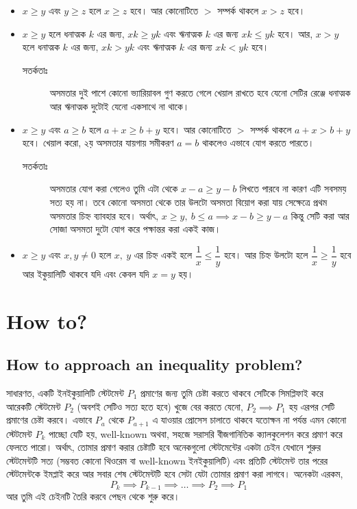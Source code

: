 \documentclass[12pt]{article}
\begin{document}
\begin{theom*} %
    \begin{itemize}
        \item $x \geq y$ এবং $y \geq z$ হলে $x \geq z$ হবে। আর কোনোটিতে $>$ সম্পর্ক থাকলে $x > z$ হবে।
        \item $x \geq y$ হলে ধনাত্মক $k$ এর জন্য, $xk \geq yk$ এবং ঋনাত্মক $k$ এর জন্য $xk \leq yk$ হবে। আর, 
            $x > y$ হলে ধনাত্মক $k$ এর জন্য, $xk > yk$ এবং ঋনাত্মক $k$ এর জন্য $xk < yk$ হবে।
            \begin{description}
                \item[সতর্কতাঃ] অসমতার দুই পাশে কোনো ভ্যারিয়াবল গুণ করতে গেলে খেয়াল রাখতে হবে যেনো 
                সেটির রেঞ্জে ধনাত্মক আর ঋনাত্মক দুটোই যেনো একসাথে না থাকে।
            \end{description}
        \item $x \geq y$ এবং $a \geq b$ হলে $a + x \geq b + y$ হবে। আর কোনোটিতে $>$ সম্পর্ক থাকলে 
            $a + x > b+y$ হবে। খেয়াল করো, ২য় অসমতার যায়গায় সমীকরণ $a = b$ থাকলেও এভাবে যোগ করতে পারতে।
            \begin{description}
                \item[সতর্কতাঃ] অসমতার যোগ করা গেলেও তুমি এটা থেকে $x-a \geq y-b$ লিখতে পারবে না 
                কারণ এটি সবসময় সত্য হয় না। তবে কোনো অসমতা থেকে তার উলটো অসমতা বিয়োগ করা যায় 
                সেক্ষেত্রে প্রথম অসমতার চিহ্ন ব্যাবহার হবে। অর্থাৎ, $x \geq y,\ b \leq a \implies x-b \geq y-a$ 
                কিন্তু সেটি করা আর সোজা অসমতা দুটো যোগ করে পক্ষান্তর করা একই কাজ। 
            \end{description}
        \item $x \geq y$ এবং $x,y\neq 0$ হলে $x,\ y$ এর চিহ্ন একই হলে $\dfrac 1x \leq \dfrac 1y$ হবে। আর চিহ্ন 
            উলটো হলে $\dfrac 1x \geq \dfrac 1y$ হবে আর ইকুয়ালিটি থাকবে যদি এবং কেবল যদি $x=y$ হয়।
    \end{itemize}
\end{theom*}
\section{How to?}
\subsection{How to approach an inequality problem?}
সাধারণত, একটি ইনইকুয়ালিটি স্টেটমেন্ট $P_1$ প্রমাণের জন্য তুমি চেষ্টা করতে থাকবে সেটিকে সিমপ্লিফাই করে আরেকটি 
স্টেটমেন্ট $P_2$ (অবশই সেটিও সত্য হতে হবে) খুজে বের করতে যেনো, $P_2 \implies P_1$ হয় এরপর সেটি প্রমাণের চেষ্টা করবে। 
এভাবে $P_a$ থেকে $P_{a+1}$ এ যাওয়ার প্রোসেস চালাতে থাকবে যতোক্ষন না পর্যন্ত এমন কোনো স্টেটমেন্ট $P_k$ পাচ্ছো যেটি হয়, well-known অথবা, সহজে সরাসরি বীজগানিতিক 
ক্যালকুলেশন করে প্রমাণ করে ফেলতে পারো। অর্থাৎ, তোমার প্রমাণ করার চেষ্টাটি হবে অনেকগুলো স্টেটমেন্টের 
একটা চেইন যেখানে শুরুর স্টেটমেন্টটি সত্য (সম্ভবত কোনো থিওরেম বা well-known ইনইকুয়ালিটি) এবং প্রতিটি স্টেটমেন্ট তার পরের স্টেটমেন্টকে ইমপ্লাই করে আর 
সবার শেষ স্টেটমেন্টটি হবে সেটা যেটা তোমার প্রমাণ করা লাগবে। অনেকটা এরকম, 
$$P_k \implies P_{k-1} \implies \dots \implies P_2 \implies P_1$$
আর তুমি এই চেইনটি তৈরি করবে পেছন থেকে শুরু করে। 
\end{document}
